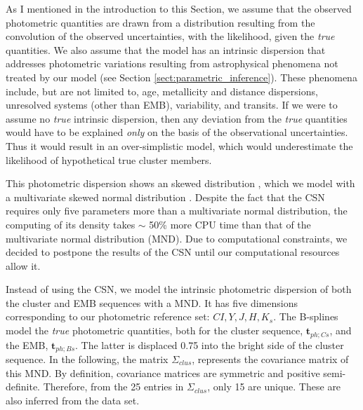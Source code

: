As I mentioned in the introduction to this Section, we assume that the observed photometric quantities are drawn from a distribution resulting from the convolution of the observed uncertainties, with the likelihood, given the \emph{true} quantities. We also assume that the model has an intrinsic dispersion that addresses photometric variations resulting from astrophysical phenomena not treated by our model (see Section \ref{sect:parametric_inference}). These phenomena include, but are not limited to, age, metallicity and distance dispersions, unresolved systems (other than EMB), variability, and transits. If we were to assume no \emph{true} intrinsic dispersion, then any deviation from the \emph{true} quantities would have to be explained \emph{only} on the basis of the observational uncertainties. Thus it would result in an over-simplistic model, which would underestimate the likelihood of hypothetical true cluster members. 

This photometric dispersion shows an skewed distribution \cite[see Figure 2 of][which I reproduce in Fig. \ref{fig:luminosity_dispersion}]{2008ASPC..384..200H}, which we model with a multivariate skewed normal distribution \cite[CSN, see for example][]{Gonzalez-Farias2004,Gupta2004}. Despite the fact that the CSN requires only five parameters more than a multivariate normal distribution, the computing of its density takes $\sim$ 50\% more CPU time than that of the multivariate normal distribution (MND). Due to computational constraints, we decided to postpone the results of the CSN until our computational resources allow it. 

Instead of using the CSN, we model the intrinsic photometric  dispersion of both the cluster and EMB sequences with a MND. It has five dimensions corresponding to our photometric reference set: $CI,Y,J,H,K_s$. The B-splines model the \emph{true} photometric quantities, both for the cluster sequence, $\mathbf{t}_{ph;Cs}$, and the EMB, $\mathbf{t}_{ph;Bs}$. The latter is displaced 0.75 into the bright side of the cluster sequence. In the following, the matrix $\Sigma_{clus}$, represents the covariance matrix of this MND. By definition, covariance matrices are symmetric and positive semi-definite. Therefore, from the 25 entries in $\Sigma_{clus}$, only 15 are unique. These are also inferred from the data set.


